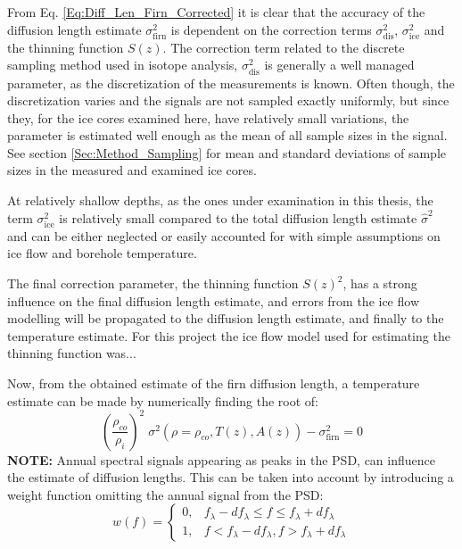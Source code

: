 \documentclass[../../CompleteThesis2/Complete_2ndDraft]{subfiles}
\begin{document}
From Eq. \ref{Eq:Diff_Len_Firn_Corrected} it is clear that the accuracy of the diffusion length estimate $\sigma_{\text{firn}}^2$ is dependent on the correction terms $\sigma_{\text{dis}}^2$, $\sigma_{\text{ice}}^2$ and the thinning function $S(z)$. The correction term related to the discrete sampling method used in isotope analysis, $\sigma_{\text{dis}}^2$ is generally a well managed parameter, as the discretization of the measurements is known. Often though, the discretization varies and the signals are not sampled exactly uniformly, but since they, for the ice cores examined here, have relatively small variations, the parameter is estimated well enough as the mean of all sample sizes in the signal. See section \ref{Sec:Method_Sampling} for mean and standard deviations of sample sizes in the measured and examined ice cores.

At relatively shallow depths, as the ones under examination in this thesis, the term $\sigma_{\text{ice}}^2$ is relatively small compared to the total diffusion length estimate $\hat{\sigma}^2$ and can be either neglected or easily accounted for with simple assumptions on ice flow and borehole temperature. 

The final correction parameter, the thinning function $S(z)^2$, has a strong influence on the final diffusion length estimate, and errors from the ice flow modelling will be propagated to the diffusion length estimate, and finally to the temperature estimate. For this project the ice flow model used for estimating the thinning function was...

Now, from the obtained estimate of the firn diffusion length, a temperature estimate can be made by numerically finding the root of:
\begin{equation}
	\left(\frac{\rho_{co}}{\rho_i}\right)^2\;\sigma^2(\rho=\rho_{co}, T(z),A(z)) - \sigma_{\text{firn}}^2 = 0
	\label{Eq:Firn_Temp_est_Roots}
\end{equation}
\textbf{NOTE:} Annual spectral signals appearing as peaks in the PSD, can influence the  estimate of diffusion lengths. This can be taken into account by introducing a weight function omitting the annual signal from the PSD:
\begin{equation}
	w(f) = \begin{cases}
		0, & f_{\lambda} - d f_{\lambda} \leq f \leq f_{\lambda} + d f_{\lambda} \\
		1, & f < f_{\lambda} - d f_{\lambda}, f > f_{\lambda} + d f_{\lambda}
	\end{cases}
\end{equation}
\end{document}
